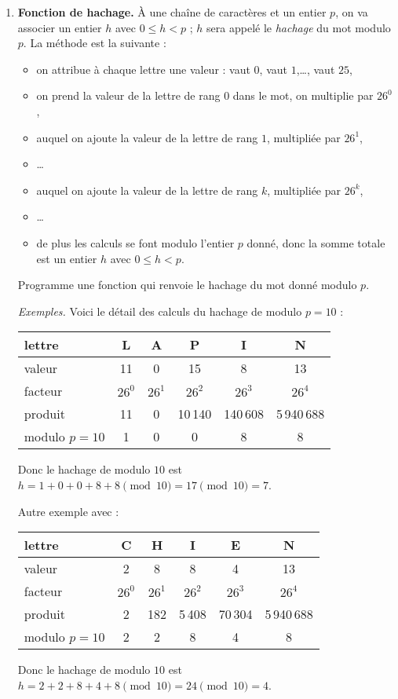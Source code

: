 \documentclass[11pt,class=report,crop=false]{standalone}
\begin{document}
\begin{activite}[Doublons]
 
\begin{enumerate}
  \item \textbf{Fonction de hachage.}
  À une chaîne de caractères et un entier $p$, on va associer un entier $h$ avec $0 \le h < p$ ; $h$ sera appelé le \emph{hachage} du mot modulo $p$. La méthode est la suivante :
  \begin{itemize}
    \item on attribue à chaque lettre une valeur :  vaut $0$,  vaut $1$,\ldots,  vaut $25$,
    \item on prend la valeur de la lettre de rang $0$ dans le mot, on multiplie par $26^0$,
    \item auquel on ajoute la valeur de la lettre de rang $1$, multipliée par $26^1$,
    \item \ldots
    \item auquel on ajoute la valeur de la lettre de rang $k$, multipliée par $26^k$,
    \item \ldots
    \item de plus les calculs se font modulo l'entier $p$ donné, donc la somme totale est un entier $h$ avec $0 \le h < p$.
  \end{itemize}


Programme une fonction  qui renvoie le hachage du mot donné modulo $p$.

\bigskip

\emph{Exemples.}
Voici le détail des calculs du hachage de  modulo $p=10$ :
\begin{center}
\begin{tabular}{|l|c|c|c|c|c|}
  \hline
  lettre & {\bf L} & {\bf A} & {\bf P} & {\bf I} & {\bf N}  \\ 
  \hline\hline
  valeur & 11 & 0  & 15 & 8 & 13  \\\hline
  facteur & $26^0$ & $26^1$ & $26^2$ & $26^3$ & $26^4$ \\\hline  
  produit & 11 & 0 & 10\,140 & 140\,608 & 5\,940\,688  \\\hline
  modulo $p=10$ & 1 & 0 & 0 & 8 & 8 \\
  \hline
\end{tabular}
\end{center}
Donc le hachage de  modulo $10$ est $h= 1+0+0+8+8 \pmod{10} = 17 \pmod{10} = 7$.

Autre exemple avec  :
\begin{center}
\begin{tabular}{|l|c|c|c|c|c|}
  \hline
  lettre & {\bf C} & {\bf H} & {\bf I} & {\bf E} & {\bf N}  \\ 
  \hline\hline
  valeur & 2 & 8  & 8 & 4 & 13  \\\hline
  facteur & $26^0$ & $26^1$ & $26^2$ & $26^3$ & $26^4$ \\\hline  
  produit & 2 & 182 & 5\,408 & 70\,304 & 5\,940\,688  \\\hline
  modulo $p=10$ & 2 & 2 & 8 & 4 & 8 \\
  \hline
\end{tabular}
\end{center}
Donc le hachage de  modulo $10$ est $h= 2+2+8+4+8 \pmod{10} = 24 \pmod{10} = 4$.


\end{enumerate}
\end{activite}
\end{document}
